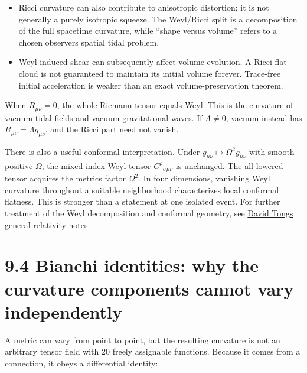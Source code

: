 \documentclass[
  11pt,
  letterpaper,
  oneside,
  openany]{scrbook}
\providecommand{\tightlist}{%
  \setlength{\itemsep}{0pt}\setlength{\parskip}{0pt}}
\begin{document}
\begin{itemize}
\tightlist
\item
  Ricci curvature can also contribute to anisotropic distortion; it is
  not generally a purely isotropic squeeze. The Weyl/Ricci split is a
  decomposition of the full spacetime curvature, while ``shape versus
  volume'' refers to a chosen observer\textquotesingle s spatial tidal
  problem.
\item
  Weyl-induced shear can subsequently affect volume evolution. A
  Ricci-flat cloud is not guaranteed to maintain its initial volume
  forever. Trace-free initial acceleration is weaker than an exact
  volume-preservation theorem.
\end{itemize}

When \(R_{\mu\nu}=0\), the whole Riemann tensor equals Weyl. This is the
curvature of vacuum tidal fields and vacuum gravitational waves. If
\(\Lambda\ne0\), vacuum instead has \(R_{\mu\nu}=\Lambda g_{\mu\nu}\),
and the Ricci part need not vanish.

There is also a useful conformal interpretation. Under
\(g_{\mu\nu}\mapsto\Omega^2g_{\mu\nu}\) with smooth positive \(\Omega\),
the mixed-index Weyl tensor \(C^\rho{}_{\sigma\mu\nu}\) is unchanged.
The all-lowered tensor acquires the metric\textquotesingle s factor
\(\Omega^2\). In four dimensions, vanishing Weyl curvature throughout a
suitable neighborhood characterizes local conformal flatness. This is
stronger than a statement at one isolated event. For further treatment
of the Weyl decomposition and conformal geometry, see
\href{https://davidtong.org/pdfs/teaching/general-relativity/gr.pdf}{David
Tong\textquotesingle s general relativity notes}.

\hypertarget{bianchi-identities-why-the-curvature-components-cannot-vary-independently}{%
\section{9.4 Bianchi identities: why the curvature components cannot
vary
independently}\label{bianchi-identities-why-the-curvature-components-cannot-vary-independently}}

A metric can vary from point to point, but the resulting curvature is
not an arbitrary tensor field with 20 freely assignable functions.
Because it comes from a connection, it obeys a differential identity:

\begin{center}
\begingroup
{}
\ifdim\wd\grmathbox>\linewidth
\resizebox{\linewidth}{!}{\usebox{\grmathbox}}
\else\usebox{\grmathbox}\fi
\endgroup
\end{center}
\end{document}
